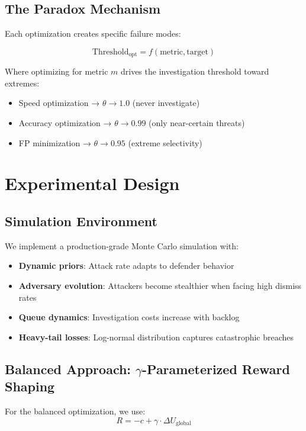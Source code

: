 \documentclass[11pt]{article}
\begin{document}
\subsection{The Paradox Mechanism}
Each optimization creates specific failure modes:

\begin{equation}
\text{Threshold}_{\text{opt}} = f(\text{metric}, \text{target})
\end{equation}

Where optimizing for metric $m$ drives the investigation threshold toward extremes:
\begin{itemize}
\item Speed optimization → $\theta \to 1.0$ (never investigate)
\item Accuracy optimization → $\theta \to 0.99$ (only near-certain threats)
\item FP minimization → $\theta \to 0.95$ (extreme selectivity)
\end{itemize}

\section{Experimental Design}

\subsection{Simulation Environment}
We implement a production-grade Monte Carlo simulation with:
\begin{itemize}
\item \textbf{Dynamic priors}: Attack rate adapts to defender behavior
\item \textbf{Adversary evolution}: Attackers become stealthier when facing high dismiss rates
\item \textbf{Queue dynamics}: Investigation costs increase with backlog
\item \textbf{Heavy-tail losses}: Log-normal distribution captures catastrophic breaches
\end{itemize}

\subsection{Balanced Approach: $\gamma$-Parameterized Reward Shaping}
For the balanced optimization, we use:
\begin{equation}
R = -c + \gamma \cdot \Delta U_{\text{global}}
\end{equation}
\end{document}
